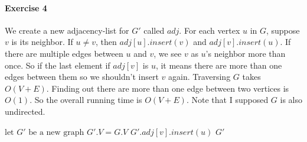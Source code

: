 \documentclass{book}
\begin{document}
	\paragraph{Exercise 4}
	We create a new adjacency-list for $G'$ called $adj$. For each vertex $u$ in $G$, suppose $v$ is its neighbor. If $u \ne v$, then $adj[u].insert(v)$ and $adj[v].insert(u)$. If there are multiple edges between $u$ and $v$, we see $v$ as $u$'s neighbor more than once. So if the last element if $adj[v]$ is $u$, it means there are more than one edges between them so we shouldn't insert $v$ again. Traversing $G$ takes $O(V + E)$. Finding out there are more than one edge between two vertices is $O(1)$. So the overall running time is $O(V + E)$. Note that I supposed $G$ is also undirected.
	\begin{algorithm}[h!]
		\begin{algorithmic}[1]
			\State $\text{let }G' \text{ be a new graph}$
			\State $G'.V = G.V$
						\State $G'.adj[v].insert(u)$		
					\EndIf
				\EndFor
			\EndFor
			\State \Return $G'$
			\EndFunction
		\end{algorithmic}
	\end{algorithm}
\end{document}
